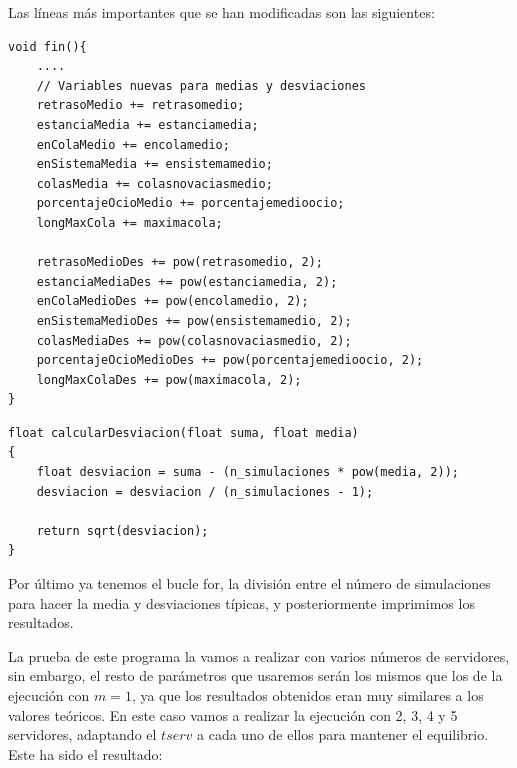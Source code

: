 \documentclass[11pt,a4paper]{report}
\begin{document}
Las líneas más importantes que se han modificadas son las siguientes:
\begin{lstlisting}
void fin(){
	....
	// Variables nuevas para medias y desviaciones
	retrasoMedio += retrasomedio;
	estanciaMedia += estanciamedia;
	enColaMedio += encolamedio;
	enSistemaMedia += ensistemamedio;
	colasMedia += colasnovaciasmedio;
	porcentajeOcioMedio += porcentajemedioocio;
	longMaxCola += maximacola;

	retrasoMedioDes += pow(retrasomedio, 2);
	estanciaMediaDes += pow(estanciamedia, 2);
	enColaMedioDes += pow(encolamedio, 2);
	enSistemaMedioDes += pow(ensistemamedio, 2);
	colasMediaDes += pow(colasnovaciasmedio, 2);
	porcentajeOcioMedioDes += pow(porcentajemedioocio, 2);
	longMaxColaDes += pow(maximacola, 2);
}
\end{lstlisting}
\begin{lstlisting}
float calcularDesviacion(float suma, float media)
{
    float desviacion = suma - (n_simulaciones * pow(media, 2));
    desviacion = desviacion / (n_simulaciones - 1);

    return sqrt(desviacion);
}
\end{lstlisting}

Por último ya tenemos el bucle for, la división entre el número de simulaciones para hacer la media y desviaciones típicas, y posteriormente imprimimos
los resultados.

La prueba de este programa la vamos a realizar con varios números de servidores, sin embargo, el resto de parámetros que usaremos serán los mismos que
los de la ejecución con $m=1$, ya que los resultados obtenidos eran muy similares a los valores teóricos. En este caso vamos a realizar la ejecución con
2, 3, 4 y 5 servidores, adaptando el $tserv$ a cada uno de ellos para mantener el equilibrio. Este ha sido el resultado:
\end{document}

